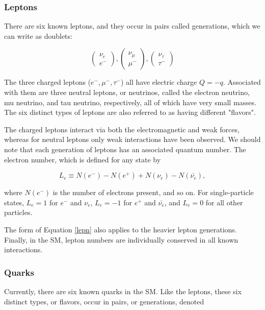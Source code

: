 \subsubsection{Leptons}
There are six known leptons, and they occur in pairs called generations, which we can write as doublets:

\begin{equation}
	\begin{pmatrix}
		\nu_{e}\\
		e^{-}
	\end{pmatrix},
\begin{pmatrix}
		\nu_{\mu}\\
		\mu^{-}
	\end{pmatrix},
	\begin{pmatrix}
		\nu_{\tau}\\
		\tau^{-}
	\end{pmatrix}
\end{equation}

The three charged leptons ($e^{-}, \mu^{-},\tau^{-}$) all have electric charge $Q=-q$. Associated with them are three neutral leptons, or neutrinos, called the electron neutrino, mu neutrino, and tau neutrino, respectively, all of which have very small masses. The six distinct types of leptons are also referred to as having different "flavors". 

The charged leptons interact via both the electromagnetic and weak forces, whereas for neutral leptons only weak interactions have been observed. We should note that each generation of leptons has an associated quantum number. The electron number, which is defined for any state by

\begin{equation}
\label{lepn}
L_{e}\equiv N(e^{-}) - N(e^{+}) + N(\nu_{e}) - N(\bar{\nu_{e}}),
\end{equation}

where $N(e^{-})$ is the number of electrons present, and so on. For single-particle states, $L_{e} = 1$ for $e^{-}$ and $\nu_{e}$, $L_{e}=-1$ for $e^{+}$ and $\bar{\nu_{e}}$, and $L_{e}=0$ for all other particles.

The form of Equation \ref{lepn} also applies to the heavier lepton generations. Finally, in the SM, lepton numbers are individually conserved in all known interactions.

\subsubsection{Quarks}
Currently, there are six known quarks in the SM. Like the leptons, these six distinct types, or flavors, occur in pairs, or generations, denoted

